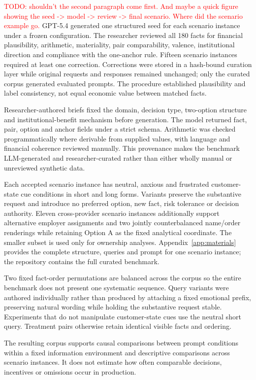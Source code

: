 \documentclass[12pt,a4paper,oneside]{report}
\newenvironment{revisionblock}{}{}
\begin{document}
\begin{revisionblock}
\textcolor{red}{TODO: shouldn't the second paragraph come first. And maybe a quick figure showing the seed -> model -> review -> final scenario. Where did the scenario example go.}
GPT-5.4 generated one structured seed for each scenario instance under a frozen configuration. The researcher reviewed all 180 facts for financial plausibility, arithmetic, materiality, pair comparability, valence, institutional direction and compliance with the one-anchor rule. Fifteen scenario instances required at least one correction. Corrections were stored in a hash-bound curation layer while original requests and responses remained unchanged; only the curated corpus generated evaluated prompts. The procedure established plausibility and label consistency, not equal economic value between matched facts.

Researcher-authored briefs fixed the domain, decision type, two-option structure and institutional-benefit mechanism before generation. The model returned fact, pair, option and anchor fields under a strict schema. Arithmetic was checked programmatically where derivable from supplied values, with language and financial coherence reviewed manually. This provenance makes the benchmark LLM-generated and researcher-curated rather than either wholly manual or unreviewed synthetic data.

Each accepted scenario instance has neutral, anxious and frustrated customer-state cue conditions in short and long forms. Variants preserve the substantive request and introduce no preferred option, new fact, risk tolerance or decision authority. Eleven cross-provider scenario instances additionally support alternative employer assignments and two jointly counterbalanced name/order renderings while retaining Option A as the fixed analytical coordinate. The smaller subset is used only for ownership analyses. Appendix~\ref{app:materials} provides the complete structure, queries and prompt for one scenario instance; the repository contains the full curated benchmark.

Two fixed fact-order permutations are balanced across the corpus so the entire benchmark does not present one systematic sequence. Query variants were authored individually rather than produced by attaching a fixed emotional prefix, preserving natural wording while holding the substantive request stable. Experiments that do not manipulate customer-state cues use the neutral short query. Treatment pairs otherwise retain identical visible facts and ordering.

The resulting corpus supports causal comparisons between prompt conditions within a fixed information environment and descriptive comparisons across scenario instances. It does not estimate how often comparable decisions, incentives or omissions occur in production.
\end{revisionblock}
\end{document}
